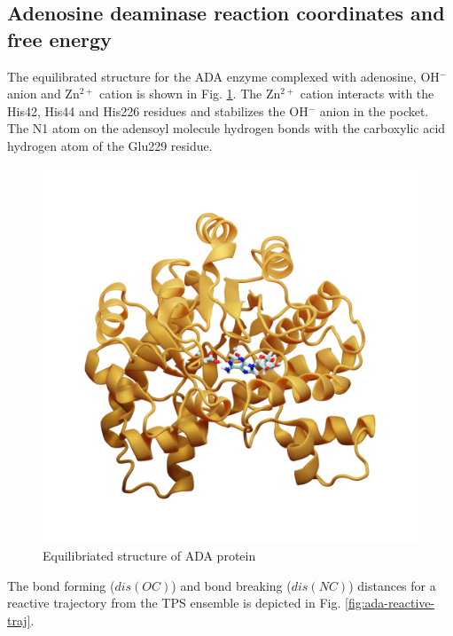 \documentclass[journal=jpcbfk,manuscript=article,layout=traditional]{achemso}
\begin{document}
\subsection{Adenosine deaminase reaction coordinates and free energy}
The equilibrated structure for the ADA enzyme complexed with adenosine, 
OH$^{-}$ anion and Zn$^{2+}$ cation is shown in Fig. \ref{fig:ada-equil}.
The Zn$^{2+}$ cation interacts with the His42, His44 and His226 residues
and stabilizes the OH$^{-}$ anion in the pocket. The N1 atom on the adensoyl 
molecule hydrogen bonds with the carboxylic acid hydrogen atom of the Glu229 
residue.  
\begin{figure}[ht!]
\centering
\includegraphics[scale=0.2]{./figures/ada-equil.png}
\caption{Equilibriated structure of ADA protein}
\label{fig:ada-equil}
\end{figure}
The bond forming ($dis(OC)$) and bond breaking ($dis(NC)$) distances 
for a reactive trajectory from the TPS ensemble is depicted 
in Fig. \ref{fig:ada-reactive-traj}.
\end{document}
